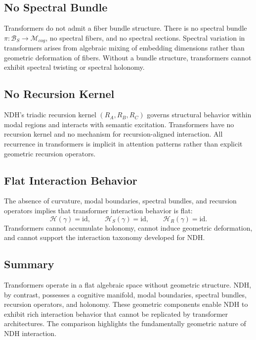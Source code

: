 \subsection{No Spectral Bundle}

Transformers do not admit a fiber bundle structure. There is no spectral bundle
$\pi : \mathcal{B}_S \to \mathcal{M}_{cog}$, no spectral fibers, and no spectral
sections. Spectral variation in transformers arises from algebraic mixing of
embedding dimensions rather than geometric deformation of fibers. Without a
bundle structure, transformers cannot exhibit spectral twisting or spectral
holonomy.

\subsection{No Recursion Kernel}

NDH's triadic recursion kernel $(R_A, R_B, R_C)$ governs structural behavior
within modal regions and interacts with semantic excitation. Transformers have
no recursion kernel and no mechanism for recursion-aligned interaction. All
recurrence in transformers is implicit in attention patterns rather than
explicit geometric recursion operators.

\subsection{Flat Interaction Behavior}

The absence of curvature, modal boundaries, spectral bundles, and recursion
operators implies that transformer interaction behavior is flat:
\[
\mathcal{H}(\gamma) = \mathrm{id}, \qquad
\mathcal{H}_S(\gamma) = \mathrm{id}, \qquad
\mathcal{H}_R(\gamma) = \mathrm{id}.
\]
Transformers cannot accumulate holonomy, cannot induce geometric deformation,
and cannot support the interaction taxonomy developed for NDH.

\subsection{Summary}

Transformers operate in a flat algebraic space without geometric structure.
NDH, by contrast, possesses a cognitive manifold, modal boundaries, spectral
bundles, recursion operators, and holonomy. These geometric components enable
NDH to exhibit rich interaction behavior that cannot be replicated by
transformer architectures. The comparison highlights the fundamentally geometric
nature of NDH interaction.

